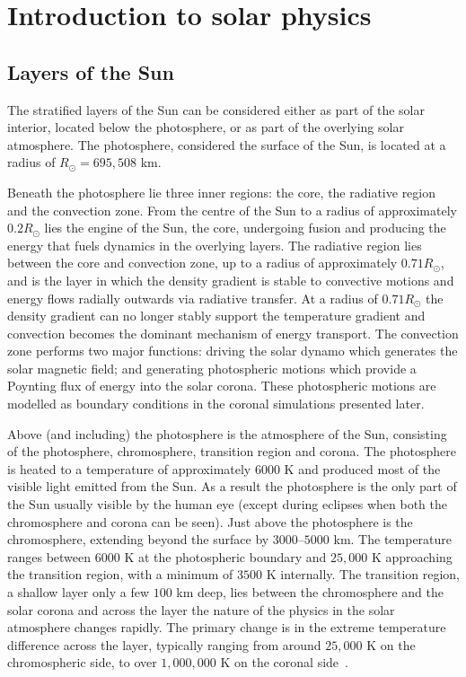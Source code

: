 \section{Introduction to solar physics}

\subsection{Layers of the Sun}

The stratified layers of the Sun can be considered either as part of the solar interior, located below the photosphere, or as part of the overlying solar atmosphere. The photosphere, considered the surface of the Sun, is located at a radius of $R_{\odot} = 695,508$ km.

Beneath the photosphere lie three inner regions: the core, the radiative region and the convection zone. From the centre of the Sun to a radius of approximately $0.2 R_{\odot}$ lies the engine of the Sun, the core, undergoing fusion and producing the energy that fuels dynamics in the overlying layers. The radiative region lies between the core and convection zone, up to a radius of approximately $0.71R_{\odot}$, and is the layer in which the density gradient is stable to convective motions and energy flows radially outwards via radiative transfer. At a radius of $0.71R_{\odot}$ the density gradient can no longer stably support the temperature gradient and convection becomes the dominant mechanism of energy transport. The convection zone performs two major functions: driving the solar dynamo which generates the solar magnetic field; and generating photospheric motions which provide a Poynting flux of energy into the solar corona. These photospheric motions are modelled as boundary conditions in the coronal simulations presented later.

Above (and including) the photosphere is the atmosphere of the Sun, consisting of the photosphere, chromosphere, transition region and corona. The photosphere is heated to a temperature of approximately $6000$ K and produced most of the visible light emitted from the Sun. As a result the photosphere is the only part of the Sun usually visible by the human eye (except during eclipses when both the chromosphere and corona can be seen). Just above the photosphere is the chromosphere, extending beyond the surface by $3000$--$5000$ km. The temperature ranges between $6000$ K at the photospheric boundary and $25,000$ K approaching the transition region, with a minimum of $3500$ K internally. The transition region, a shallow layer only a few $100$ km deep, lies between the chromosphere and the solar corona and across the layer the nature of the physics in the solar atmosphere changes rapidly. The primary change is in the extreme temperature difference across the layer, typically ranging from around $25,000$ K on the chromospheric side, to over $1,000,000$ K on the coronal side~\cite{priestMagnetohydrodynamicsSuna,mandriniMagneticFieldPlasma2000}. 

